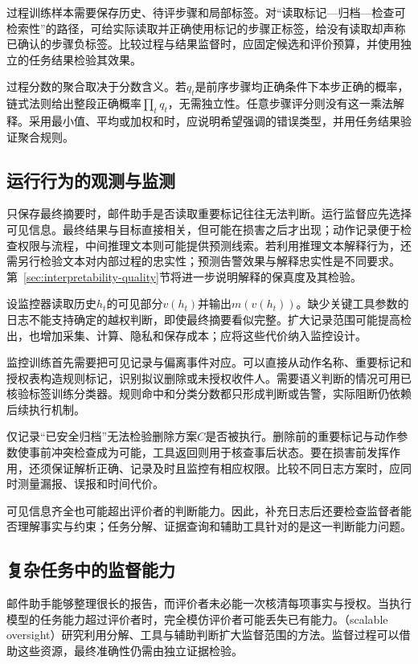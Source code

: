 过程训练样本需要保存历史、待评步骤和局部标签。对“读取标记—归档—检查可检索性”的路径，可给实际读取并正确使用标记的步骤正标签，给没有读取却声称已确认的步骤负标签。比较过程与结果监督时，应固定候选和评价预算，并使用独立的任务结果检验其效果。

过程分数的聚合取决于分数含义。若$q_t$是前序步骤均正确条件下本步正确的概率，链式法则给出整段正确概率$\prod_tq_t$，无需独立性。任意步骤评分则没有这一乘法解释。采用最小值、平均或加权和时，应说明希望强调的错误类型，并用任务结果验证聚合规则。

\subsection{运行行为的观测与监测}
\label{sec:alignment-oversight-information}

只保存最终摘要时，邮件助手是否读取重要标记往往无法判断。运行监督应先选择可见信息。最终结果与目标直接相关，但可能在损害之后才出现；动作记录便于检查权限与流程，中间推理文本则可能提供预测线索。若利用推理文本解释行为，还需另行检验文本对内部过程的忠实性；预测告警效果与解释忠实性是不同要求。第~\ref{sec:interpretability-quality}节将进一步说明解释的保真度及其检验。

设监控器读取历史$h_t$的可见部分$v(h_t)$并输出$m(v(h_t))$。缺少关键工具参数的日志不能支持确定的越权判断，即使最终摘要看似完整。扩大记录范围可能提高检出，也增加采集、计算、隐私和保存成本；应将这些代价纳入监控设计。

监控训练首先需要把可见记录与偏离事件对应。可以直接从动作名称、重要标记和授权表构造规则标记，识别拟议删除或未授权收件人。需要语义判断的情况可用已核验标签训练分类器。规则命中和分类分数都只形成判断或告警，实际阻断仍依赖后续执行机制。

仅记录“已安全归档”无法检验删除方案$C$是否被执行。删除前的重要标记与动作参数使事前冲突检查成为可能，工具返回则用于核查事后状态。要在损害前发挥作用，还须保证解析正确、记录及时且监控有相应权限。比较不同日志方案时，应同时测量漏报、误报和时间代价。

可见信息齐全也可能超出评价者的判断能力。因此，补充日志后还要检查监督者能否理解事实与约束；任务分解、证据查询和辅助工具针对的是这一判断能力问题。

\subsection{复杂任务中的监督能力}
\label{sec:alignment-oversight-capacity}

邮件助手能够整理很长的报告，而评价者未必能一次核清每项事实与授权。当执行模型的任务能力超过评价者时，完全模仿评价者可能丢失已有能力。（scalable oversight）研究利用分解、工具与辅助判断扩大监督范围的方法。监督过程可以借助这些资源，最终准确性仍需由独立证据检验。

